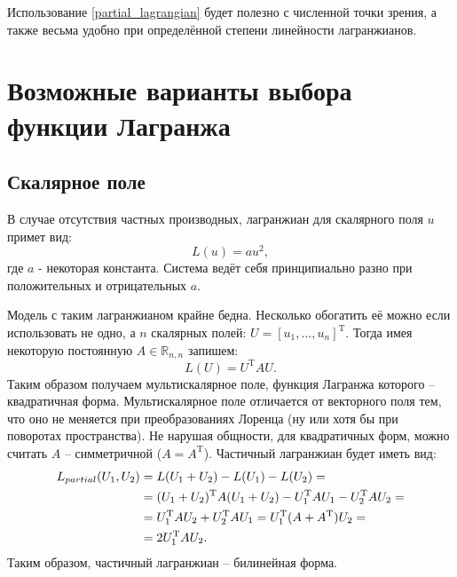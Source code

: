 Использование \ref{partial_lagrangian} будет полезно с численной точки зрения, а также весьма удобно при определённой степени линейности лагранжианов.

\section{Возможные варианты выбора функции Лагранжа}
\subsection{Скалярное поле}
В случае отсутствия частных производных, лагранжиан для скалярного поля $u$ примет вид:
\begin{equation}
	L(u) = au^2,
	\label{L_scalar}
\end{equation}
где $a$ - некоторая константа. Система ведёт себя принципиально разно при положительных и отрицательных $a$.

Модель с таким лагранжианом крайне бедна. Несколько обогатить её можно если использовать не одно, а $n$ скалярных полей:
$U = [u_1, ..., u_n]^\mathrm{T}$. Тогда имея некоторую постоянную $A \in \mathbb{R}_{n,n}$ запишем:
\begin{equation}
	L(U) = U^\mathrm{T}AU.
	\label{L_multiscalar}
\end{equation}
Таким образом получаем мультискалярное поле, функция Лагранжа которого -- квадратичная форма.
Мультискалярное поле отличается от векторного поля тем, что оно не меняется при преобразованиях Лоренца (ну или хотя бы при поворотах пространства).
Не нарушая общности, для квадратичных форм, можно считать $A$ -- симметричной ($A = A^\mathrm{T}$). Частичный лагранжиан будет иметь вид:
\begin{align}
	L_{partial}(U_1, U_2) &= L(U_1 + U_2) - L(U_1) - L(U_2) = \notag \\
						   &= (U_1+U_2)^\mathrm{T}A(U_1+U_2) - U_1^\mathrm{T}AU_1 - U_2^\mathrm{T}AU_2 = \notag \\
						   &=U_1^\mathrm{T}AU_2 + U_2^\mathrm{T}AU_1 = U_1^\mathrm{T}(A+A^\mathrm{T})U_2 = \notag \\
						   &=2U_1^\mathrm{T}AU_2.
	\label{L_partial_multiscalar}
\end{align}
Таким образом, частичный лагранжиан -- билинейная форма.

